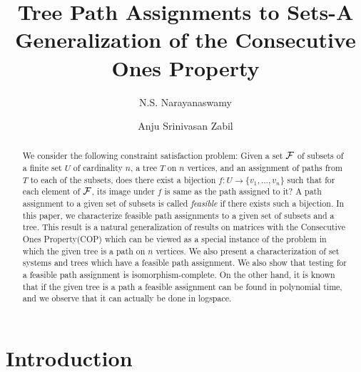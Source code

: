 \documentclass{llncs}
\def\cF{{\cal F}}
\begin{document}
\title{Tree Path Assignments to Sets-A Generalization of the Consecutive Ones Property}

\author{N.S. Narayanaswamy  \and Anju Srinivasan Zabil }



\date{}

\maketitle

\begin{abstract}
We consider the following constraint satisfaction problem: Given a set $\cF$ of subsets  of a finite set $U$ of cardinality $n$, a tree $T$ on $n$ vertices, and an assignment of paths from $T$ to each of the subsets, does there exist a bijection $f:U \rightarrow \{v_1,\ldots,v_n\}$ such that for each element of $\cF$,  its image under $f$ is same as the path assigned to it?    A path assignment to a given set of subsets is called {\em feasible} if there exists such a bijection.   In this paper, we characterize feasible path assignments to  a given set of subsets and a tree.   This result is a natural generalization of results on matrices with the Consecutive Ones Property(COP) which can be viewed as a special instance of the problem in which the given tree is a path on $n$ vertices.  We also present a characterization of set systems and trees which have a feasible path assignment.  We also show that testing for a feasible path assignment is isomorphism-complete.  On the other hand, it is known that if the given tree is a path a feasible assignment can be found in polynomial time, and we observe that it can actually be done in logspace.
\end{abstract}

\section{Introduction}
\end{document}
